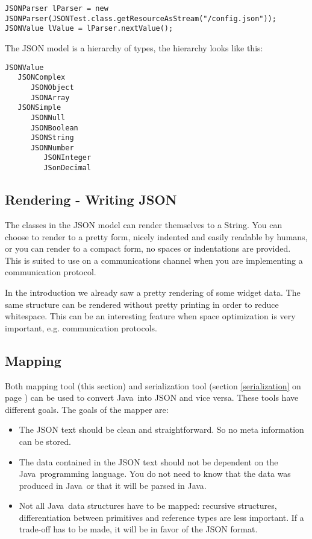 \documentclass[a4paper]{article}
\newcommand{\java}{Java}
\begin{document}
\medskip
\begin{lstlisting}[basicstyle=\ttfamily\scriptsize{}]
JSONParser lParser = new JSONParser(JSONTest.class.getResourceAsStream("/config.json"));
JSONValue lValue = lParser.nextValue();
\end{lstlisting}
\medskip

The JSON model is a hierarchy of types, the hierarchy looks like this:

\medskip
\begin{lstlisting}
JSONValue
   JSONComplex
      JSONObject
      JSONArray
   JSONSimple
      JSONNull
      JSONBoolean
      JSONString
      JSONNumber
         JSONInteger
         JSonDecimal
\end{lstlisting}
\medskip

\subsection{Rendering - Writing JSON}

The classes in the JSON model can render themselves to a String. You can choose to render to a pretty form, nicely indented and easily readable by humans, or you can render to a compact form, no spaces or indentations are provided. This is suited to use on a communications channel when you are implementing a communication protocol.

In the introduction we already saw a pretty rendering of some widget data. The same structure can be rendered without pretty printing in order to reduce whitespace. This can be an interesting feature when space optimization is very important, e.g. communication protocols.

\subsection{Mapping}
\label{mapping}

Both mapping tool (this section) and serialization tool (section \ref{serialization} on page \pageref{serialization}) can be used to convert \java\ into JSON and vice versa. These tools have different goals. The goals of the mapper are:

\begin{itemize}
	\item The JSON text should be clean and straightforward. So no meta information can be stored.
	\item The data contained in the JSON text should not be dependent on the \java\ programming language. You do not need to know that the data was produced in \java\ or that it will be parsed in \java.
	\item Not all \java\ data structures have to be mapped: recursive structures, differentiation between primitives and reference types are less important. If a trade-off has to be made, it will be in favor of the JSON format.
\end{itemize}
\end{document}
